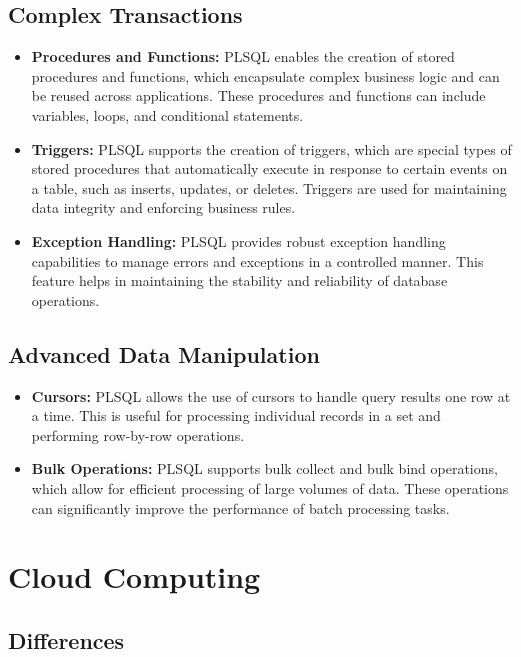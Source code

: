 \documentclass[a4paper,12pt]{report}
\begin{document}
	\subsection{Complex Transactions}
	\begin{itemize}
		\item \textbf{Procedures and Functions:} PLSQL enables the creation of stored procedures and functions, which encapsulate complex business logic and can be reused across applications. These procedures and functions can include variables, loops, and conditional statements.
		\item \textbf{Triggers:} PLSQL supports the creation of triggers, which are special types of stored procedures that automatically execute in response to certain events on a table, such as inserts, updates, or deletes. Triggers are used for maintaining data integrity and enforcing business rules.
		\item \textbf{Exception Handling:} PLSQL provides robust exception handling capabilities to manage errors and exceptions in a controlled manner. This feature helps in maintaining the stability and reliability of database operations.
	\end{itemize}
	
	\subsection{Advanced Data Manipulation}
	\begin{itemize}
		\item \textbf{Cursors:} PLSQL allows the use of cursors to handle query results one row at a time. This is useful for processing individual records in a set and performing row-by-row operations.
		\item \textbf{Bulk Operations:} PLSQL supports bulk collect and bulk bind operations, which allow for efficient processing of large volumes of data. These operations can significantly improve the performance of batch processing tasks.
	\end{itemize}
	

	
\section{Cloud Computing}

\subsection{Differences}
\end{document}
